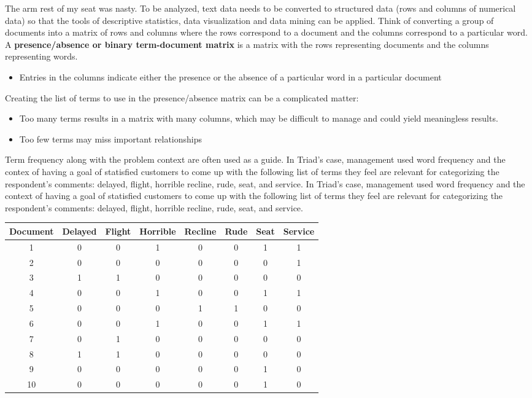 \documentclass{report}
\begin{document}
\noindent The arm rest of my seat was nasty.
\newpage
\noindent
To be analyzed, text data needs to be converted to structured data (rows and columns of numerical data) so that the tools of descriptive statistics, data visualization and data mining can be applied.
\bigbreak \noindent
Think of converting a group of documents into a matrix of rows and columns where the rows correspond to a document and the columns correspond to a particular word.
\bigbreak \noindent
A \textbf{presence/absence or binary term-document matrix} is a matrix with the rows representing documents and the columns representing words.
\begin{itemize}[label=$\circ$]
  \item  Entries in the columns indicate either the presence or the absence of a particular word in a particular document
\end{itemize}
\bigbreak \noindent
Creating the list of terms to use in the presence/absence matrix can be a complicated matter:
\begin{itemize}
  \item Too many terms results in a matrix with many columns, which may be difficult to manage and could yield meaningless results. 
  \item Too few terms may miss important relationships
\end{itemize}
Term frequency along with the problem context are often used as a guide.
\bigbreak \noindent
In Triad's case, management used word frequency and the contex of having a goal of statisfied customers to come up with the following list of terms they feel are relevant for categorizing the respondent's comments: delayed, flight, horrible recline, rude, seat, and service. In Triad's case, management used word frequency and the context of having a goal of statisfied customers to come up with the following list of terms they feel are relevant for categorizing the respondent's comments: delayed, flight, horrible recline, rude, seat, and service.
\begin{table}[htbp]
  \centering
  \begin{tabular}{cccccccc}
    \toprule
    Document & Delayed & Flight & Horrible & Recline & Rude & Seat & Service \\
    \midrule
    1 & 0 & 0 & 1 & 0 & 0 & 1 & 1 \\
    2 & 0 & 0 & 0 & 0 & 0 & 0 & 1 \\
    3 & 1 & 1 & 0 & 0 & 0 & 0 & 0 \\
    4 & 0 & 0 & 1 & 0 & 0 & 1 & 1 \\
    5 & 0 & 0 & 0 & 1 & 1 & 0 & 0 \\
    6 & 0 & 0 & 1 & 0 & 0 & 1 & 1 \\
    7 & 0 & 1 & 0 & 0 & 0 & 0 & 0 \\
    8 & 1 & 1 & 0 & 0 & 0 & 0 & 0 \\
    9 & 0 & 0 & 0 & 0 & 0 & 1 & 0 \\
    10 & 0 & 0 & 0 & 0 & 0 & 1 & 0 \\
    \bottomrule
  \end{tabular}
\end{table}
\newpage
\end{document}
